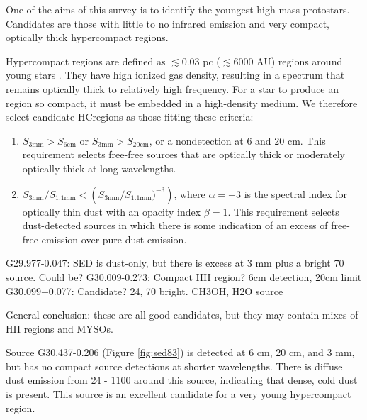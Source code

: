 \documentclass[twocolumn]{aastex62}
\begin{document}
One of the aims of this survey is to identify the youngest high-mass
protostars.  Candidates are those with little to no infrared emission and very
compact, optically thick hypercompact \hii regions.

Hypercompact \hii regions are defined as $\lesssim0.03$ pc ($\lesssim6000$ AU)
\hii regions around young stars \citep{Kurtz2005b}.  They have high ionized
gas density, resulting in a spectrum that remains optically thick to relatively
high frequency.  For a star to produce an \hii region so compact, it must be
embedded in a high-density medium.  We therefore select candidate HC\hii regions
as those fitting these criteria:
\begin{enumerate}
    \item $S_{3 \mathrm{mm}} > S_{6 \mathrm{cm}}$ or $S_{3 \mathrm{mm}} > S_{20 \mathrm{cm}}$,
        or a nondetection at 6 and 20 cm.  This requirement selects free-free sources that are optically
        thick or moderately optically thick at long wavelengths.
    \item $S_{3 \mathrm{mm}} / S_{1.1 \mathrm{mm}} < \left(S_{3
        \mathrm{mm}} / S_{1.1 \mathrm{mm}})^{-3}\right)$,  where $\alpha=-3$ is the
        spectral index for optically thin dust with an opacity index $\beta=1$.
        This requirement selects dust-detected sources in which there is some
        indication of an excess of free-free emission over pure dust emission.
\end{enumerate}

G29.977-0.047: SED is dust-only, but there is excess at 3 mm plus a bright 70 \um source.  Could be?
G30.009-0.273: Compact HII region?  6cm detection, 20cm limit
G30.099+0.077: Candidate?  24, 70 \um bright.  CH3OH, H2O source

General conclusion: these are all good candidates, but they may contain mixes of HII regions and MYSOs.


Source G30.437-0.206 (Figure \ref{fig:sed83}) is detected at 6 cm, 20 cm, and 3
mm, but has no compact source detections at shorter wavelengths.  There is
diffuse dust emission from 24 - 1100 \um around this source, indicating that
dense, cold dust is present.  This source is an excellent candidate for a very
young hypercompact \hii region.
\end{document}
